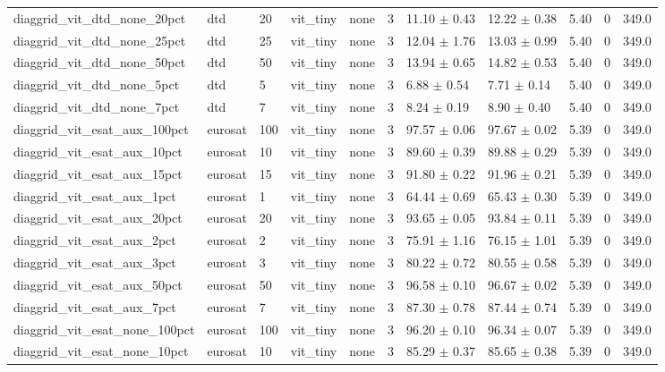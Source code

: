 \begin{tabular}{lllllllllll}
diaggrid_vit_dtd_none_20pct & dtd & 20 & vit_tiny & none & 3 & 11.10 $\pm$ 0.43 & 12.22 $\pm$ 0.38 & 5.40 & 0 & 349.0 \\
diaggrid_vit_dtd_none_25pct & dtd & 25 & vit_tiny & none & 3 & 12.04 $\pm$ 1.76 & 13.03 $\pm$ 0.99 & 5.40 & 0 & 349.0 \\
diaggrid_vit_dtd_none_50pct & dtd & 50 & vit_tiny & none & 3 & 13.94 $\pm$ 0.65 & 14.82 $\pm$ 0.53 & 5.40 & 0 & 349.0 \\
diaggrid_vit_dtd_none_5pct & dtd & 5 & vit_tiny & none & 3 & 6.88 $\pm$ 0.54 & 7.71 $\pm$ 0.14 & 5.40 & 0 & 349.0 \\
diaggrid_vit_dtd_none_7pct & dtd & 7 & vit_tiny & none & 3 & 8.24 $\pm$ 0.19 & 8.90 $\pm$ 0.40 & 5.40 & 0 & 349.0 \\
diaggrid_vit_esat_aux_100pct & eurosat & 100 & vit_tiny & none & 3 & 97.57 $\pm$ 0.06 & 97.67 $\pm$ 0.02 & 5.39 & 0 & 349.0 \\
diaggrid_vit_esat_aux_10pct & eurosat & 10 & vit_tiny & none & 3 & 89.60 $\pm$ 0.39 & 89.88 $\pm$ 0.29 & 5.39 & 0 & 349.0 \\
diaggrid_vit_esat_aux_15pct & eurosat & 15 & vit_tiny & none & 3 & 91.80 $\pm$ 0.22 & 91.96 $\pm$ 0.21 & 5.39 & 0 & 349.0 \\
diaggrid_vit_esat_aux_1pct & eurosat & 1 & vit_tiny & none & 3 & 64.44 $\pm$ 0.69 & 65.43 $\pm$ 0.30 & 5.39 & 0 & 349.0 \\
diaggrid_vit_esat_aux_20pct & eurosat & 20 & vit_tiny & none & 3 & 93.65 $\pm$ 0.05 & 93.84 $\pm$ 0.11 & 5.39 & 0 & 349.0 \\
diaggrid_vit_esat_aux_2pct & eurosat & 2 & vit_tiny & none & 3 & 75.91 $\pm$ 1.16 & 76.15 $\pm$ 1.01 & 5.39 & 0 & 349.0 \\
diaggrid_vit_esat_aux_3pct & eurosat & 3 & vit_tiny & none & 3 & 80.22 $\pm$ 0.72 & 80.55 $\pm$ 0.58 & 5.39 & 0 & 349.0 \\
diaggrid_vit_esat_aux_50pct & eurosat & 50 & vit_tiny & none & 3 & 96.58 $\pm$ 0.10 & 96.67 $\pm$ 0.02 & 5.39 & 0 & 349.0 \\
diaggrid_vit_esat_aux_7pct & eurosat & 7 & vit_tiny & none & 3 & 87.30 $\pm$ 0.78 & 87.44 $\pm$ 0.74 & 5.39 & 0 & 349.0 \\
diaggrid_vit_esat_none_100pct & eurosat & 100 & vit_tiny & none & 3 & 96.20 $\pm$ 0.10 & 96.34 $\pm$ 0.07 & 5.39 & 0 & 349.0 \\
diaggrid_vit_esat_none_10pct & eurosat & 10 & vit_tiny & none & 3 & 85.29 $\pm$ 0.37 & 85.65 $\pm$ 0.38 & 5.39 & 0 & 349.0 \\

\end{tabular}
